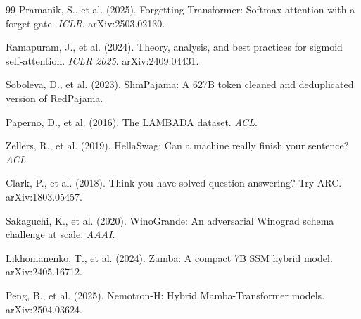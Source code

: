 \documentclass[11pt]{article}
\begin{document}
\begin{thebibliography}{99}
Pramanik, S., et al. (2025). Forgetting Transformer: Softmax attention with a forget gate. \emph{ICLR}. arXiv:2503.02130.

Ramapuram, J., et al. (2024). Theory, analysis, and best practices for sigmoid self-attention. \emph{ICLR 2025}. arXiv:2409.04431.

Soboleva, D., et al. (2023). SlimPajama: A 627B token cleaned and deduplicated version of RedPajama.

Paperno, D., et al. (2016). The LAMBADA dataset. \emph{ACL}.

Zellers, R., et al. (2019). HellaSwag: Can a machine really finish your sentence? \emph{ACL}.

Clark, P., et al. (2018). Think you have solved question answering? Try ARC. arXiv:1803.05457.

Sakaguchi, K., et al. (2020). WinoGrande: An adversarial Winograd schema challenge at scale. \emph{AAAI}.

Likhomanenko, T., et al. (2024). Zamba: A compact 7B SSM hybrid model. arXiv:2405.16712.

Peng, B., et al. (2025). Nemotron-H: Hybrid Mamba-Transformer models. arXiv:2504.03624.

\end{thebibliography}
\end{document}
